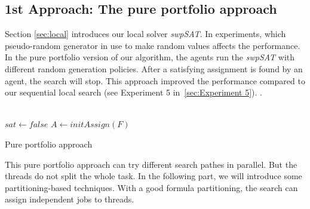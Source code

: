 \documentclass[12pt,a4paper,twoside]{scrartcl}
\numberwithin{equation}{section}
\begin{document}
\subsection{1st Approach: The pure portfolio approach}
Section \ref{sec:local} introduces our local solver \emph{swpSAT}. In experiments, which pseudo-random generator in use to make random values affects the performance. In the pure portfolio version of our algorithm, the agents run the \emph{swpSAT} with different random generation policies. After a satisfying assignment is found by an agent, the search will stop. This approach improved the performance compared to our sequential local search (see Experiment 5 in~\ref{sec:Experiment 5}). .\\ 
\\
\begin{algorithm}[H]
  $sat \leftarrow false$\;
    $A \leftarrow initAssign(F)$\;
 \caption{Pure portfolio approach}
\end{algorithm}  
This pure portfolio approach can try different search pathes in parallel. But the threads do not split the whole task. 
In the following part, we will introduce some partitioning-based techniques. With a good formula partitioning, the search can assign independent jobs to threads. 
\end{document}
